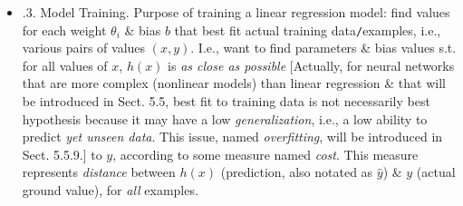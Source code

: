 \documentclass{article}
\begin{document}
\begin{itemize}
\begin{itemize}
\begin{itemize}
			\item {.3. Model Training.} Purpose of training a linear regression model: find values for each weight $\theta_i$ \& bias $b$ that best fit actual training data{\tt/}examples, i.e., various pairs of values $(x,y)$. I.e., want to find parameters \& bias values s.t. for all values of $x$, $h(x)$ is {\it as close as possible} [Actually, for neural networks that are more complex (nonlinear models) than linear regression \& that will be introduced in Sect. 5.5, best fit to training data is not necessarily best hypothesis because it may have a low {\it generalization}, i.e., a low ability to predict {\it yet unseen data}. This issue, named {\it overfitting}, will be introduced in Sect. 5.5.9.] to $y$, according to some measure named {\it cost}. This measure represents {\it distance} between $h(x)$ (prediction, also notated as $\hat{y}$) \& $y$ (actual ground value), for {\it all} examples.
			

\end{itemize}
\end{itemize}
\end{itemize}
\end{document}
